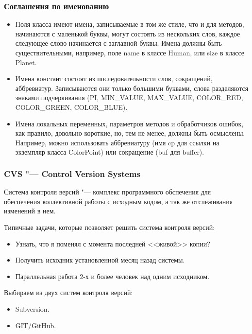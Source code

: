\documentclass[default]{beamer}
\begin{document}
	\begin{frame}
		\frametitle{Соглашения по именованию}
		
		\begin{itemize}
			\item Поля класса имеют имена, записываемые в том же стиле, что и для методов, начинаются с маленькой буквы, могут состоять из нескольких слов, каждое следующее слово начинается с заглавной буквы. Имена должны быть существительными, например, поле name в классе Human, или size в классе Planet.
			\item Имена констант состоят из последовательности слов, сокращений, аббревиатур. Записываются они только большими буквами, слова разделяются знаками подчеркивания (PI, MIN\_VALUE, MAX\_VALUE, COLOR\_RED, COLOR\_GREEN, COLOR\_BLUE).
			\item Имена локальных переменных, параметров методов и обработчиков ошибок, как правило, довольно короткие, но, тем не менее, должны быть осмыслены. Например, можно использовать аббревиатуру (имя cp для ссылки на экземпляр класса ColorPoint) или сокращение (buf для buffer).
		\end{itemize}
	\end{frame}

	\begin{frame}
		\frametitle{CVS "--- Control Version Systems}
		Система контроля версий "--- комплекс программного обспечения для обеспечения коллективной работы с исходным кодом, а так же отслеживания изменений в нем.
		
		Типичные задачи, которые позволяет решить система контроля версий:
		
		\begin{itemize}
			\item Узнать, что я поменял с момента последней <<живой>> копии?
			\item Получить исходник установленной месяц назад системы.
			\item Параллельная работа 2-х и более человек над одним исходником.
		\end{itemize}
		
		Выбираем из двух систем контроля версий:
		\begin{itemize}
			\item Subversion.
			\item GIT/GitHub.
		\end{itemize}
	\end{frame}
\end{document}
